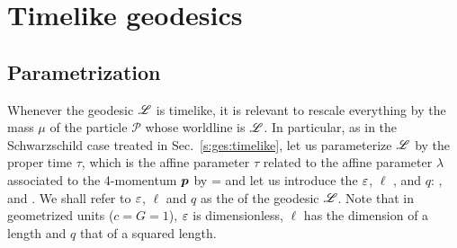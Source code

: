 \section{Timelike geodesics} \label{s:gek:timelike}

\subsection{Parametrization}

Whenever the geodesic $\mathscr{L}$ is timelike, it is relevant to
rescale everything by the mass $\mu$ of the particle $\mathscr{P}$ whose worldline is $\mathscr{L}$.
In particular, as in the Schwarzschild case treated in Sec.~\ref{s:ges:timelike},
let us parameterize $\mathscr{L}$ by the proper time $\tau$, which is the affine parameter
$\tau$ related to the affine parameter $\lambda$ associated to the 4-momentum $\bm{p}$
by
\be \label{e:gek:tau_mu_lamb}
    \tau = \mu \lambda
\ee
and let us introduce the
 $\varepsilon$,
$\ell$ ,
and  $q$:
\be \label{e:gek:def_eps_ell_mQ}
  , \qquad
   \qquad\mbox{and}\qquad
   .
\ee
We shall refer to $\varepsilon$, $\ell$ and $q$ as the
of the geodesic $\mathscr{L}$. Note that in geometrized units ($c=G=1$), $\varepsilon$ is
dimensionless, $\ell$ has the dimension of a length and $q$ that of a squared length.

